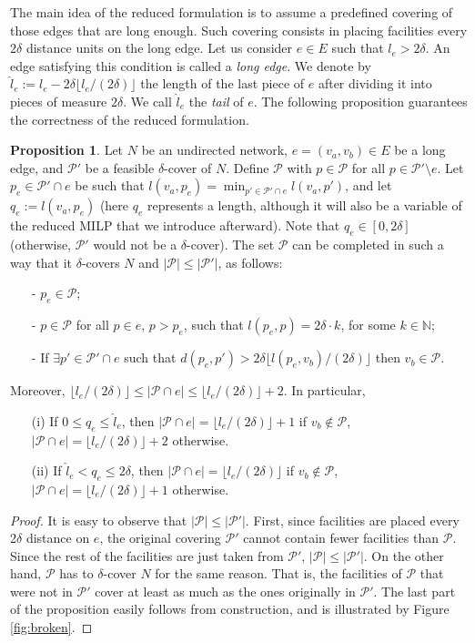 \documentclass[review]{elsarticle}
\newcommand{\cP}{{\mathcal P}}
\newcommand{\dlt}{{\delta}}
\theoremstyle{definition}
\newtheorem{proposition}{Proposition}[section]
\begin{document}
The main idea of the reduced formulation is to assume a predefined covering of those edges that are long enough. Such covering consists in placing facilities every $2\dlt$ distance units on the long edge. Let us consider $e\in E$ such that $l_e> 2\dlt$. An edge satisfying this condition is called a \emph{long edge}. We denote by $\hat{l}_e:=l_e-2\dlt\lfloor l_e/(2\dlt) \rfloor$ the length of the last piece of $e$ after dividing it into pieces of measure $2\dlt$. We call  $\hat{l}_e$ the \emph{tail} of $e$.  The following proposition guarantees the correctness of the reduced formulation.

\begin{proposition}\label{prop:broken-valid}
Let $N$ be an undirected network, $e=(v_a,v_b)\in E$ be a long edge, and $\cP '$ be a feasible $\dlt$-cover of $N$. Define $\cP$ with $p\in \cP$ for all $p\in \cP ' \setminus e$.  Let $p_e\in \cP '\cap e$ be such that $l(v_a,p_e)=\min_{p'\in \cP '\cap e} l(v_a,p')$, and let $q_e:=l(v_a,p_e)$ (here $q_e$ represents a length, although it will also be a variable of the reduced MILP that we introduce afterward). Note that $q_e\in[0,2\dlt]$ (otherwise, $\cP '$ would not be a $\dlt$-cover). The set $\cP$ can be completed in such a way that it $\dlt$-covers $N$ and $|\cP|\leq | \cP '|$, as follows:
\begin{itemize}
	\item[-] $p_e\in \cP$;
	\item[-] $p\in \cP$ for all $p\in e$, $p>p_e$, such that $l(p_e,p)=2\dlt\cdot k$, for some $k\in \mathbb{N}$;
	\item[-] If $\exists p'\in \cP '\cap e$ such that $d(p_e,p')>2\dlt\lfloor l(p_e,v_b)/(2\dlt) \rfloor$ then $v_b\in \cP $.
\end{itemize}
Moreover, $ \lfloor l_e/(2\dlt) \rfloor\leq |\cP \cap e|\leq \lfloor l_e/(2\dlt) \rfloor +2$. In particular,
\begin{enumerate}
	\item[(i)] If $0\leq q_e\leq \hat{l}_e$, then  $|\cP \cap e|= \lfloor l_e/(2\dlt) \rfloor+1$ if $v_b \notin \cP$,  $|\cP \cap e|= \lfloor l_e/(2\dlt) \rfloor+2$ otherwise.
	\item[(ii)] If $\hat{l}_e <q_e\leq 2\dlt$, then  $|\cP \cap e|= \lfloor l_e/(2\dlt) \rfloor$ if $v_b \notin \cP$,  $|\cP \cap e|= \lfloor l_e/(2\dlt) \rfloor+1$ otherwise.
\end{enumerate}
\end{proposition}
\begin{proof}
It is easy to observe that $|\cP|\leq | \cP '|$. First,  since facilities are placed every 2$\dlt$ distance on $e$, the original covering $\cP '$ cannot contain fewer facilities than $\cP$. Since the rest of the facilities are just taken from $\cP'$, $|\cP|\leq |\cP '|$. On the other hand, $\cP$ has to $\dlt$-cover $N$ for the same reason. That is, the facilities of $\cP$ that were not in $\cP '$ cover at least as much as the ones originally in $\cP'$. The last part of the proposition easily follows from construction, and is illustrated by Figure \ref{fig:broken}.
\end{proof}
\end{document}
